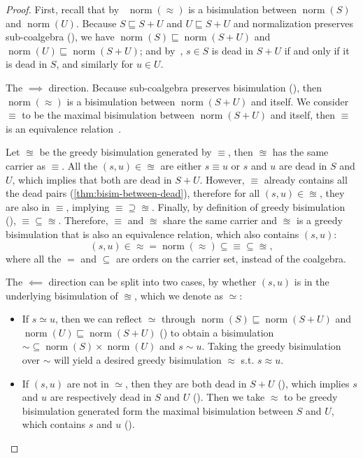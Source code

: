 \documentclass[conference]{IEEEtran}
\DeclareMathOperator{\norm}{\mathrm{norm}}
\begin{document}
\begin{proof}
    First, recall that by~ \(\norm(≈)\) is a bisimulation between \(\norm(S)\) and \(\norm(U)\).
    Because \(S ⊑ S + U\) and \(U ⊑ S + U\) and normalization preserves sub-coalgebra (), we have \(\norm(S) ⊑ \norm(S + U)\) and \(\norm(U) ⊑ \norm(S + U)\); and by~, \(s ∈ S\) is dead in \(S + U\) if and only if it is dead in \(S\), and similarly for \(u ∈ U\).

    The \(⟹\) direction. 
    Because sub-coalgebra preserves bisimulation (), then \(\norm(≈)\) is a bisimulation between \(\norm(S + U)\) and itself.
    We consider \(≡\) to be the maximal bisimulation between \(\norm(S + U)\) and itself, then \(≡\) is an equivalence relation~\cite[Corollary 5.6]{rutten_UniversalCoalgebraTheory_2000}.

    Let \(≊\) be the greedy bisimulation generated by \(≡\), then \(≊\) has the same carrier as \(≡\).
    All the \((s, u) ∈ {≊}\) are either \(s ≡ u\) or \(s\) and \(u\) are dead in \(S\) and \(U\), which implies that both are dead in \(S + U\).
    However, \(≡\) already contains all the dead pairs (\cref{thm:bisim-between-dead}), therefore for all \((s, u) ∈ {≊}\), they are also in \(≡\), implying \({≡} ⊇ {≊}\).
    Finally, by definition of greedy bisimulation (), \({≡} ⊆ {≊}\).
    Therefore, \(≡\) and \(≊\) share the same carrier and \(≊\) is a greedy bisimulation that is also an equivalence relation, which also contains \((s, u)\):
    \[(s, u) ∈ {≈} = \norm(≈) ⊆ {≡} ⊆ {≊},\]
    where all the \(=\) and \(⊆\) are orders on the carrier set, instead of the coalgebra.

    The \(⟸\) direction can be split into two cases, by whether \((s, u)\) is in the underlying bisimulation of \(≊\), which we denote as \(≃\): 
    \begin{itemize}
        \item If \(s ≃ u\), then we can reflect \(≃\)  through \(\norm(S) ⊑ \norm(S + U)\) and \(\norm(U) ⊑ \norm(S + U)\) () to obtain a bisimulation \({∼} ⊆ \norm(S) × \norm(U)\) and \(s ∼ u\).
        Taking the greedy bisimulation over \(∼\) will yield a desired greedy bisimulation \(≈\) s.t. \(s ≈ u\).
        \item If \((s, u)\) are not in \(≃\), then they are both dead in \(S + U\) (), which implies \(s\) and \(u\) are respectively dead in \(S\) and \(U\) ().
        Then we take \(≈\) to be greedy bisimulation generated form the maximal bisimulation between \(S\) and \(U\), which contains \(s\) and \(u\) ().
        \qedhere
    \end{itemize}
\end{proof}
\end{document}

